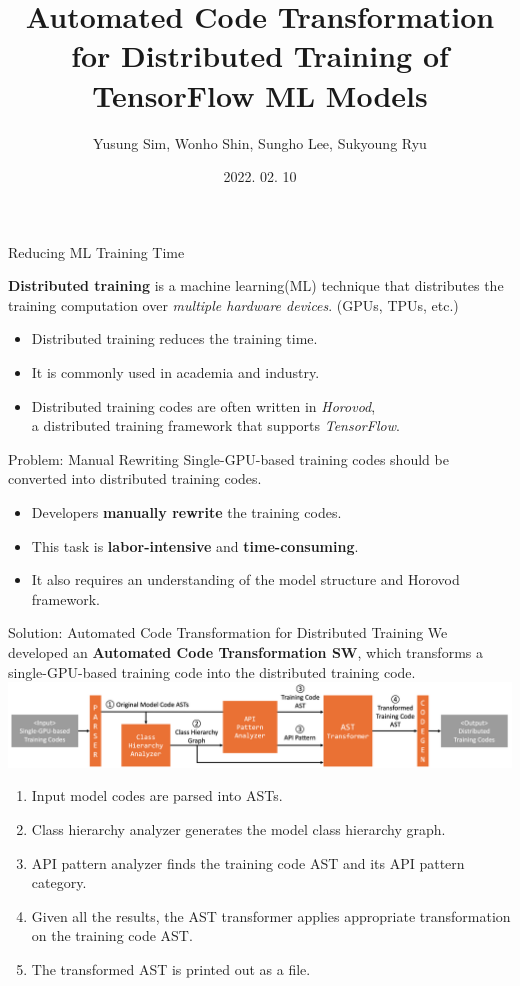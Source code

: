 \documentclass{beamer}
\title{Automated Code Transformation for Distributed Training of TensorFlow ML Models}
\author{Yusung Sim\inst{1}, Wonho Shin\inst{1}, Sungho Lee\inst{2}, Sukyoung Ryu\inst{1}}
\institute{
  \inst{1}%
  School of Computing, KAIST
  \and
  \inst{2}%
  Department of Computer Science and Engineering,\\ 
  Chungnam National University
}
\date{2022. 02. 10}
\begin{document}
\frame{\titlepage}


\begin{frame}{Reducing ML Training Time}
  \begin{definition}
    \textbf{Distributed training} is a machine learning(ML) technique
    that distributes the training computation 
    over \textit{multiple hardware devices}.
    (GPUs, TPUs, etc.)
  \end{definition}
  \begin{itemize}
    \item Distributed training reduces the training time.
    \item It is commonly used in academia and industry.
    \item Distributed training codes are often written in \textit{Horovod},\\
          a distributed training framework that supports \textit{TensorFlow}.  
  \end{itemize}
\end{frame}

\begin{frame}{Problem: Manual Rewriting}
  Single-GPU-based training codes should be converted into
  distributed training codes.
  \begin{itemize}
    \item Developers \textbf{manually rewrite} the training codes.
    \item This task is \textbf{labor-intensive} and \textbf{time-consuming}.
    \item It also requires an understanding of the model structure and Horovod framework.
  \end{itemize} 
\end{frame}

\begin{frame}{Solution: Automated Code Transformation for Distributed Training}
  We developed an \textbf{Automated Code Transformation SW}, which
  transforms a single-GPU-based training code into the distributed training code. 
  \includegraphics[width=\textwidth]{orange_arch} 

  {\scriptsize
  \begin{enumerate}
    \item Input model codes are parsed into ASTs. 
    \item Class hierarchy analyzer generates the model class hierarchy graph.
    \item API pattern analyzer finds the training code AST and its API pattern category.
    \item Given all the results, the AST transformer applies appropriate transformation
    on the training code AST.
    \item The transformed AST is printed out as a file. 
  \end{enumerate}
  }
\end{frame}
\end{document}
